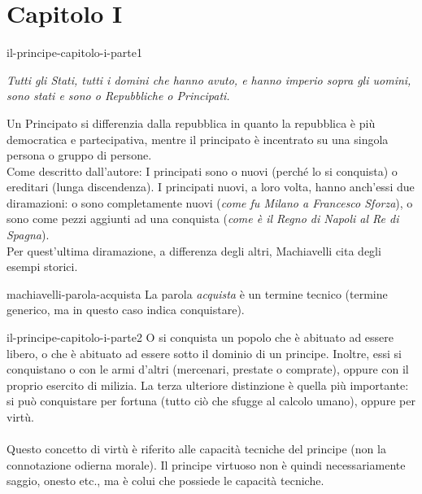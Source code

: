 \documentclass[preview]{standalone}
\begin{document}
\genpage

\section{Capitolo I}

\begin{snippet}{il-principe-capitolo-i-parte1}
    \begin{center}
        \begin{minipage}{0.75\textwidth}
            \itshape
            Tutti gli Stati, tutti i domini che hanno avuto, e hanno imperio sopra gli uomini, sono stati e sono o Repubbliche o Principati.
        \end{minipage}
    \end{center}
    \vspace{0.25cm}
    Un Principato si differenzia dalla repubblica in quanto la repubblica è più democratica e partecipativa,
    mentre il principato è incentrato su una singola persona o gruppo di persone. \\
    Come descritto dall'autore: I principati sono o nuovi (perché lo si conquista) o ereditari (lunga discendenza).
    I principati nuovi, a loro volta, hanno anch'essi due diramazioni:
    o sono completamente nuovi (\textit{come fu Milano a Francesco Sforza}),
    o sono come pezzi aggiunti ad una conquista
    (\textit{come è il Regno di Napoli al Re di Spagna}). \\
    Per quest'ultima diramazione, a differenza degli altri, Machiavelli cita degli esempi storici.
\end{snippet}

\begin{snippetnote}{machiavelli-parola-acquista}{}
    La parola \textit{acquista} è un termine tecnico (termine generico, ma in questo caso indica conquistare).
\end{snippetnote}

\begin{snippet}{il-principe-capitolo-i-parte2}
    O si conquista un popolo che è abituato ad essere libero, o che è abituato ad
    essere sotto il dominio di un principe.
    Inoltre, essi si conquistano o con le armi d'altri (mercenari, prestate o comprate),
    oppure con il proprio esercito di milizia.
    La terza ulteriore distinzione è quella più importante: si può conquistare per fortuna (tutto ciò che sfugge al calcolo umano),
    oppure per virtù.
    \\\\
    Questo concetto di virtù è riferito alle capacità tecniche del principe (non la connotazione odierna morale).
    Il principe virtuoso non è quindi necessariamente saggio, onesto etc., ma è colui che
    possiede le capacità tecniche.
\end{snippet}
\end{document}

